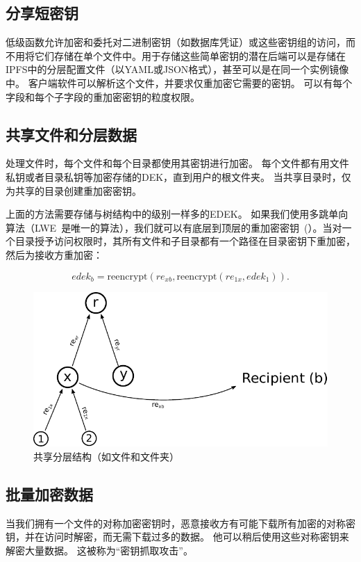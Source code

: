 \documentclass[longbibliography,nofootinbib]{revtex4-1}
\begin{document}
\subsection{分享短密钥}

低级函数允许加密和委托对二进制密钥（如数据库凭证）或这些密钥组的访问，而不用将它们存储在单个文件中。用于存储这些简单密钥的潜在后端可以是存储在IPFS中的分层配置文件（以YAML或JSON格式），甚至可以是在同一个实例镜像中。 客户端软件可以解析这个文件，并要求仅重加密它需要的密钥。 可以有每个字段和每个子字段的重加密密钥的粒度权限。

\subsection{共享文件和分层数据}
\label{sec:hierarchical-data}

        处理文件时，每个文件和每个目录都使用其密钥进行加密。 每个文件都有用文件私钥或者目录私钥等加密存储的DEK，直到用户的根文件夹。 当共享目录时，仅为共享的目录创建重加密密钥。
    
    上面的方法需要存储与树结构中的级别一样多的EDEK。 如果我们使用多跳单向算法（LWE~\cite{lwe-reencryption}是唯一的算法），我们就可以有底层到顶层的重加密密钥~(）。当对一个目录授予访问权限时，其所有文件和子目录都有一个路径在目录密钥下重加密，然后为接收方重加密：

\begin{equation}
    edek_b = \text{reencrypt}(re_{xb}, \text{reencrypt}(re_{1x}, edek_1)).
\end{equation}
\begin{figure}
\centering
    \includegraphics[width=0.45\columnwidth]{pdf/hierarchical.pdf}
    \caption{共享分层结构（如文件和文件夹）}
    \label{fig:hierarchical-pre}
\end{figure}

\subsection{批量加密数据}

        当我们拥有一个文件的对称加密密钥时，恶意接收方有可能下载所有加密的对称密钥，并在访问时解密，而无需下载过多的数据。 他可以稍后使用这些对称密钥来解密大量数据。 这被称为“密钥抓取攻击”。
    
\end{document}
